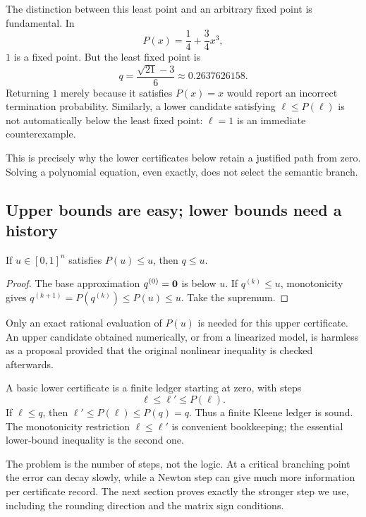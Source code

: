 The distinction between this least point and an arbitrary fixed point is fundamental. In
\begin{equation}
 \label{eq:cubic}
 P(x)=\frac14+\frac34x^3,
\end{equation}
$1$ is a fixed point. But the least fixed point is
\begin{equation}
 \label{eq:cubic-root}
 q=\frac{\sqrt{21}-3}{6}\approx0.2637626158.
\end{equation}
Returning $1$ merely because it satisfies $P(x)=x$ would report an incorrect termination probability. Similarly, a lower candidate satisfying $\ell\le P(\ell)$ is not automatically below the least fixed point: $\ell=1$ is an immediate counterexample.

This is precisely why the lower certificates below retain a justified path from zero. Solving a polynomial equation, even exactly, does not select the semantic branch.

\subsection{Upper bounds are easy; lower bounds need a history}
\begin{lemma}
\label{lem:upper}
If $u\in[0,1]^n$ satisfies $P(u)\le u$, then $q\le u$.
\end{lemma}
\begin{proof}
The base approximation $q^{(0)}=\mathbf 0$ is below $u$. If $q^{(k)}\le u$, monotonicity gives $q^{(k+1)}=P(q^{(k)})\le P(u)\le u$. Take the supremum.
\end{proof}

Only an exact rational evaluation of $P(u)$ is needed for this upper certificate. An upper candidate obtained numerically, or from a linearized model, is harmless as a proposal provided that the original nonlinear inequality is checked afterwards.

A basic lower certificate is a finite ledger starting at zero, with steps
\[
 \ell\le\ell'\le P(\ell).
\]
If $\ell\le q$, then $\ell'\le P(\ell)\le P(q)=q$. Thus a finite Kleene ledger is sound. The monotonicity restriction $\ell\le\ell'$ is convenient bookkeeping; the essential lower-bound inequality is the second one.

The problem is the number of steps, not the logic. At a critical branching point the error can decay slowly, while a Newton step can give much more information per certificate record. The next section proves exactly the stronger step we use, including the rounding direction and the matrix sign conditions.

